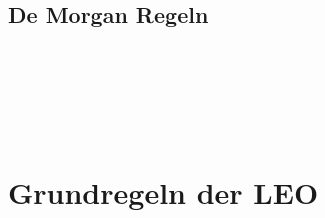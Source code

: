 \begin{multicols}{2}
\subsection*{De Morgan Regeln}
\begin{fitchproof}

\\	

\\	

\\	
\end{fitchproof}
\end{multicols}

\newpage

\section{Grundregeln der LEO}

